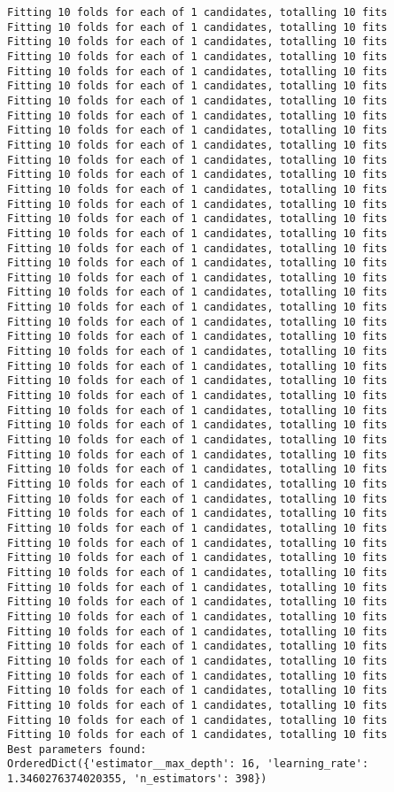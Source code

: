 \documentclass[
  letterpaper,
  DIV=11,
  numbers=noendperiod]{scrreprt}
\begin{document}
\begin{verbatim}
Fitting 10 folds for each of 1 candidates, totalling 10 fits
Fitting 10 folds for each of 1 candidates, totalling 10 fits
Fitting 10 folds for each of 1 candidates, totalling 10 fits
Fitting 10 folds for each of 1 candidates, totalling 10 fits
Fitting 10 folds for each of 1 candidates, totalling 10 fits
Fitting 10 folds for each of 1 candidates, totalling 10 fits
Fitting 10 folds for each of 1 candidates, totalling 10 fits
Fitting 10 folds for each of 1 candidates, totalling 10 fits
Fitting 10 folds for each of 1 candidates, totalling 10 fits
Fitting 10 folds for each of 1 candidates, totalling 10 fits
Fitting 10 folds for each of 1 candidates, totalling 10 fits
Fitting 10 folds for each of 1 candidates, totalling 10 fits
Fitting 10 folds for each of 1 candidates, totalling 10 fits
Fitting 10 folds for each of 1 candidates, totalling 10 fits
Fitting 10 folds for each of 1 candidates, totalling 10 fits
Fitting 10 folds for each of 1 candidates, totalling 10 fits
Fitting 10 folds for each of 1 candidates, totalling 10 fits
Fitting 10 folds for each of 1 candidates, totalling 10 fits
Fitting 10 folds for each of 1 candidates, totalling 10 fits
Fitting 10 folds for each of 1 candidates, totalling 10 fits
Fitting 10 folds for each of 1 candidates, totalling 10 fits
Fitting 10 folds for each of 1 candidates, totalling 10 fits
Fitting 10 folds for each of 1 candidates, totalling 10 fits
Fitting 10 folds for each of 1 candidates, totalling 10 fits
Fitting 10 folds for each of 1 candidates, totalling 10 fits
Fitting 10 folds for each of 1 candidates, totalling 10 fits
Fitting 10 folds for each of 1 candidates, totalling 10 fits
Fitting 10 folds for each of 1 candidates, totalling 10 fits
Fitting 10 folds for each of 1 candidates, totalling 10 fits
Fitting 10 folds for each of 1 candidates, totalling 10 fits
Fitting 10 folds for each of 1 candidates, totalling 10 fits
Fitting 10 folds for each of 1 candidates, totalling 10 fits
Fitting 10 folds for each of 1 candidates, totalling 10 fits
Fitting 10 folds for each of 1 candidates, totalling 10 fits
Fitting 10 folds for each of 1 candidates, totalling 10 fits
Fitting 10 folds for each of 1 candidates, totalling 10 fits
Fitting 10 folds for each of 1 candidates, totalling 10 fits
Fitting 10 folds for each of 1 candidates, totalling 10 fits
Fitting 10 folds for each of 1 candidates, totalling 10 fits
Fitting 10 folds for each of 1 candidates, totalling 10 fits
Fitting 10 folds for each of 1 candidates, totalling 10 fits
Fitting 10 folds for each of 1 candidates, totalling 10 fits
Fitting 10 folds for each of 1 candidates, totalling 10 fits
Fitting 10 folds for each of 1 candidates, totalling 10 fits
Fitting 10 folds for each of 1 candidates, totalling 10 fits
Fitting 10 folds for each of 1 candidates, totalling 10 fits
Fitting 10 folds for each of 1 candidates, totalling 10 fits
Fitting 10 folds for each of 1 candidates, totalling 10 fits
Fitting 10 folds for each of 1 candidates, totalling 10 fits
Fitting 10 folds for each of 1 candidates, totalling 10 fits
Best parameters found:
OrderedDict({'estimator__max_depth': 16, 'learning_rate': 1.3460276374020355, 'n_estimators': 398})
\end{verbatim}
\end{document}
